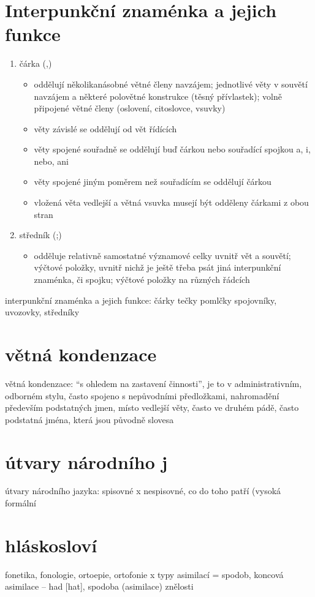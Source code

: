 \documentclass{memoir}
\begin{document}
\section*{Interpunkční znaménka a jejich funkce}
	\begin{enumerate}
		\item čárka (,)
		\begin{itemize}
			\item oddělují několikanásobné větné členy navzájem; jednotlivé věty v souvětí navzájem a některé polovětné konstrukce (těsný přívlastek); volně připojené větné členy (oslovení, citoslovce, vsuvky)
			\item věty závislé se oddělují od vět řídících
			\item věty spojené souřadně se oddělují buď čárkou nebo souřadící spojkou a, i, nebo, ani
			\item věty spojené jiným poměrem než souřadícím se oddělují čárkou
			\item vložená věta vedlejší a větná vsuvka musejí být odděleny čárkami z obou stran
		\end{itemize}
		\item středník (;)
		\begin{itemize}
			\item odděluje relativně samostatné významové celky uvnitř vět a souvětí; výčtové položky, uvnitř nichž je ještě třeba psát jiná interpunkční znaménka, či spojku; výčtové položky na různých řádcích
		\end{itemize}
	\end{enumerate}
interpunkční znaménka a jejich funkce: čárky tečky pomlčky spojovníky, uvozovky, středníky

\section*{větná kondenzace}
větná kondenzace: “s ohledem na zastavení činnosti”, je to v administrativním, odborném stylu, často spojeno s nepůvodními předložkami, nahromadění především podstatných jmen, místo vedlejší věty, často ve druhém pádě, často podstatná jména, která jsou původně slovesa

\section*{útvary národního j}
útvary národního jazyka: spisovné x nespisovné, co do toho patří (vysoká formální

\section*{hláskosloví}
fonetika, fonologie, ortoepie, ortofonie x typy asimilací = spodob, koncová asimilace – had [hat], spodoba (asimilace) znělosti
\end{document}
